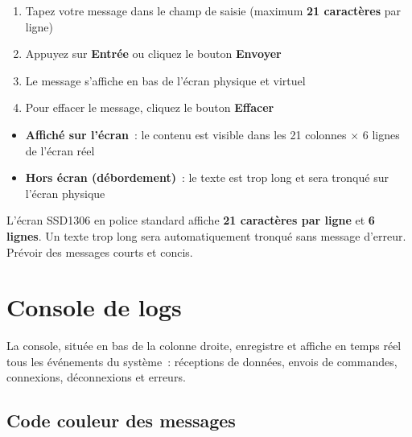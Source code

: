 \documentclass[a4paper,12pt]{article}
\newcommand{\infobox}[2]{%
  \begin{tcolorbox}[mybox,
    colback=LightBlue, colframe=AccentBlue,
    colbacktitle=AccentBlue, coltitle=white,
    title={$\triangleright$\enspace #1}]#2\end{tcolorbox}}
\newcommand{\warnbox}[2]{%
  \begin{tcolorbox}[mybox,
    colback=LightOrange, colframe=WarnOrange,
    colbacktitle=WarnOrange, coltitle=white,
    title={$\triangle$\enspace #1}]#2\end{tcolorbox}}
\begin{document}
\begin{enumerate}[noitemsep, label=\arabic*.]
  \item Tapez votre message dans le champ de saisie (maximum \textbf{21 caract\`eres} par ligne)
  \item Appuyez sur \textbf{Entr\'ee} ou cliquez le bouton \textbf{Envoyer}
  \item Le message s'affiche en bas de l'\'ecran physique et virtuel
  \item Pour effacer le message, cliquez le bouton \textbf{Effacer}
\end{enumerate}

\infobox{Indicateurs d'affichage sous le simulateur}{
\begin{itemize}[noitemsep]
  \item \textbf{Affich\'e sur l'\'ecran}~: le contenu est visible dans les 21 colonnes $\times$ 6 lignes de l'\'ecran r\'eel
  \item \textbf{Hors \'ecran (d\'ebordement)}~: le texte est trop long et sera tronqu\'e sur l'\'ecran physique
\end{itemize}
}

\warnbox{Limite de caract\`eres}{
L'\'ecran SSD1306 en police standard affiche \textbf{21 caract\`eres par ligne} et \textbf{6 lignes}.
Un texte trop long sera automatiquement tronqu\'e sans message d'erreur. Pr\'evoir des messages courts et concis.
}

\section{Console de logs}

La console, situ\'ee en bas de la colonne droite, enregistre et affiche en temps r\'eel
tous les \'ev\'enements du syst\`eme~: r\'eceptions de donn\'ees, envois de commandes,
connexions, d\'econnexions et erreurs.

\subsection{Code couleur des messages}
\end{document}
